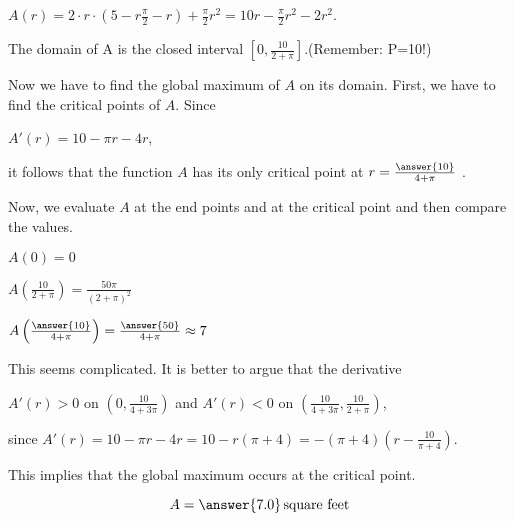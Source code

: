 \documentclass{ximera}
\begin{document}
\begin{exercise}
\begin{hint}
           $A(r)=2\cdot r\cdot (5-r\frac{\pi}{2}-r)+\frac{\pi}{2} r^2=10r-\frac{\pi}{2}r^2-2r^2$.
           
           The domain of A is  the closed interval $\left[0,\frac{10}{2+\pi}\right]$.(Remember: P=10!)
              \end{hint}
                \begin{hint}
                Now we have to find the global maximum of $A$ on its domain.
                First, we have to find the critical points of $A$.
                Since
                
                $A'(r)=10-\pi r-4r$,
                
                it follows that the function $A$ has its only critical point at  $r=\frac{\answer{10}}{4+\pi}$ .
                              \end{hint}
                                \begin{hint}
                                Now, we evaluate $A$ at the end points and at the critical point and then compare the values.
                                
                                $A(0)=0$
                                
                                $A\left(\frac{10}{2+\pi}\right)=\frac{50\pi}{(2+\pi)^2}$
                                
                                $A\left(\frac{\answer{10}}{4+\pi}\right)=\frac{\answer{50}}{4+\pi}\approx 7$
                                
                                This seems complicated. It is better to argue that the derivative 
                                
                                $A'(r)>0$ on $\left(0,\frac{10}{4+3\pi}\right)$ and  $A'(r)<0$ on $\left(\frac{10}{4+3\pi},\frac{10}{2+\pi}\right)$,
                                
                                 since $A'(r)=10-\pi r-4r=10-r(\pi+4)=-(\pi+4)\left(r-\frac{10}{\pi+4}\right)$.
                                 
                                 
                                 This implies that the global maximum occurs at the critical point.

                                  \end{hint}
  \begin{prompt}
  \[
  A = \answer{7.0}\,\text{square feet}
  \]
  \end{prompt}
\end{exercise}
\end{document}
